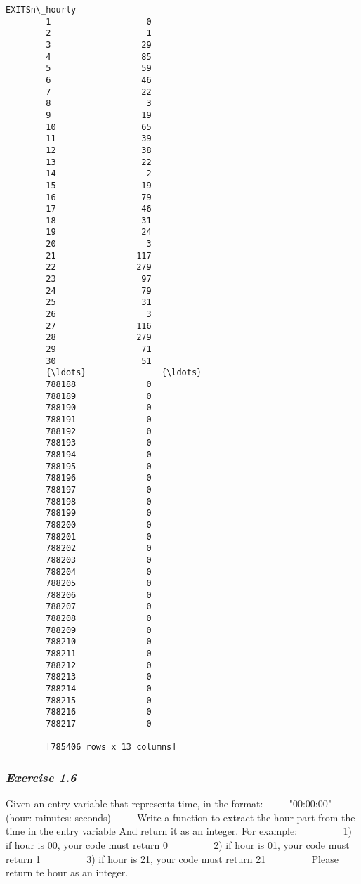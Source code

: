 \documentclass[11pt]{article}
\begin{document}
\begin{Verbatim}[commandchars=\\\{\}]
                EXITSn\_hourly  
        1                   0  
        2                   1  
        3                  29  
        4                  85  
        5                  59  
        6                  46  
        7                  22  
        8                   3  
        9                  19  
        10                 65  
        11                 39  
        12                 38  
        13                 22  
        14                  2  
        15                 19  
        16                 79  
        17                 46  
        18                 31  
        19                 24  
        20                  3  
        21                117  
        22                279  
        23                 97  
        24                 79  
        25                 31  
        26                  3  
        27                116  
        28                279  
        29                 71  
        30                 51  
        {\ldots}               {\ldots}  
        788188              0  
        788189              0  
        788190              0  
        788191              0  
        788192              0  
        788193              0  
        788194              0  
        788195              0  
        788196              0  
        788197              0  
        788198              0  
        788199              0  
        788200              0  
        788201              0  
        788202              0  
        788203              0  
        788204              0  
        788205              0  
        788206              0  
        788207              0  
        788208              0  
        788209              0  
        788210              0  
        788211              0  
        788212              0  
        788213              0  
        788214              0  
        788215              0  
        788216              0  
        788217              0  
        
        [785406 rows x 13 columns]
\end{Verbatim}
            
    \subsubsection{\texorpdfstring{\emph{Exercise
1.6}}{Exercise 1.6}}\label{exercise-1.6}

Given an entry variable that represents time, in the format: ~~~~
"00:00:00" (hour: minutes: seconds) ~~~~ Write a function to extract the
hour part from the time in the entry variable And return it as an
integer. For example: ~~~~~~~~ 1) if hour is 00, your code must return 0
~~~~~~~~ 2) if hour is 01, your code must return 1 ~~~~~~~~ 3) if hour
is 21, your code must return 21 ~~~~~~~~ Please return te hour as an
integer.
\end{document}
